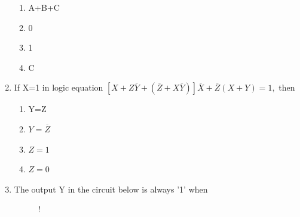 \documentclass[journal,12pt,twocolumn]{IEEEtran}
\begin{document}
\begin{enumerate}
   \begin{enumerate}
     \item A+B+C
      \item 0
      \item 1
      \item C
    \end{enumerate} 
    
     \item If X=1 in logic equation $[X+Z{\overline{Y}+(\overline{Z}+X\overline{Y})}]{\overline{X}+\overline{Z}(X+Y)}=1,$ then
    \begin{enumerate}
      \item Y=Z
      \item $Y=\overline{Z}$
      \item $Z=1$
      \item $Z=0$
    \end{enumerate}
     \item The output Y in the circuit below is always '1' when
\begin{figure}[!h]
\centering
\resizebox {\columnwidth} {!} {

}
\caption{}
\end{figure}

%
     
  

\end{enumerate}
\end{document}
